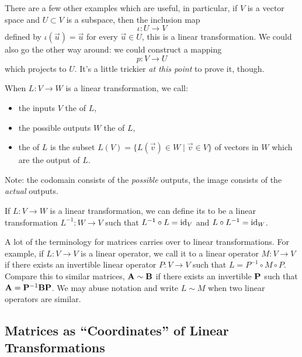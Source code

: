 There are a few other examples which are useful, in particular, if
$V$ is a vector space and $U\subset V$ is a subspace, then the inclusion
map
\begin{equation}
\iota\colon U\to V
\end{equation}
defined by $\iota(\vec{u})=\vec{u}$ for every $\vec{u}\in U$, this is a
linear transformation. We could also go the other way around: we could
construct a mapping
\begin{equation}
p\colon V\to U
\end{equation}
which projects to $U$. It's a little trickier \emph{at this point} to
prove it, though.

\begin{definition}
  When $L\colon V\to W$ is a linear transformation, we call:
\begin{itemize}
\item the inputs $V$ the  of $L$, 
\item the possible outputs $W$ the  of $L$,
\item the  of $L$ is the subset $L(V) = \{L(\vec{v})\in W\mid\vec{v}\in V\}$
of vectors in $W$ which are the output of $L$.
\end{itemize}
Note: the codomain consists of the \emph{possible} outputs, the image
consists of the \emph{actual} outputs.
\end{definition}

\begin{definition}
If $L\colon V\to W$ is a linear transformation, we can define its
 to be a linear transformation $L^{-1}\colon W\to V$
such that $L^{-1}\circ L=\mathrm{id}_{V}$ and $L\circ L^{-1}=\mathrm{id}_{W}$.
\end{definition}

\M
A lot of the terminology for matrices carries over to linear
transformations. For example, if $L\colon V\to V$ is a linear operator,
we call it  to a linear operator $M\colon V\to V$ if
there exists an invertible linear operator $P\colon V\to V$ such that
$L = P^{-1}\circ M \circ P$.
Compare this to similar matrices, $\mathbf{A} \sim\mathbf{B}$ if there exists
an invertible $\mathbf{P}$ such that $\mathbf{A}=\mathbf{P}^{-1}\mathbf{B}\mathbf{P}$.
We may abuse notation and write $L\sim M$ when two linear operators are
similar. 

\subsection{Matrices as ``Coordinates'' of Linear Transformations}

